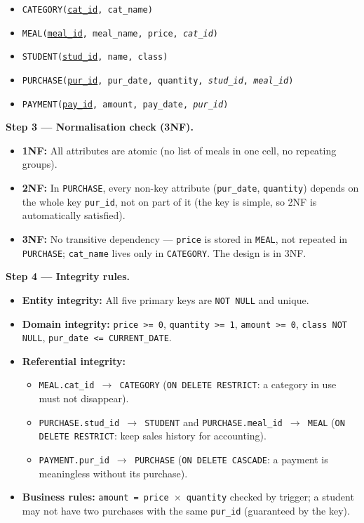 \documentclass[11pt]{article}
\begin{document}
\begin{itemize}
\item \texttt{CATEGORY(\underline{cat\_id}, cat\_name)}
\item \texttt{MEAL(\underline{meal\_id}, meal\_name, price, \emph{cat\_id})}
\item \texttt{STUDENT(\underline{stud\_id}, name, class)}
\item \texttt{PURCHASE(\underline{pur\_id}, pur\_date, quantity, \emph{stud\_id}, \emph{meal\_id})}
\item \texttt{PAYMENT(\underline{pay\_id}, amount, pay\_date, \emph{pur\_id})}
\end{itemize}

\textbf{Step 3 — Normalisation check (3NF).} 
\begin{itemize}
\item \textbf{1NF:} All attributes are atomic (no list of meals in one cell, no repeating groups).
\item \textbf{2NF:} In \texttt{PURCHASE}, every non-key attribute (\texttt{pur\_date}, \texttt{quantity}) depends on the whole key \texttt{pur\_id}, not on part of it (the key is simple, so 2NF is automatically satisfied).
\item \textbf{3NF:} No transitive dependency — \texttt{price} is stored in \texttt{MEAL}, not repeated in \texttt{PURCHASE}; \texttt{cat\_name} lives only in \texttt{CATEGORY}. The design is in 3NF.
\end{itemize}

\textbf{Step 4 — Integrity rules.}
\begin{itemize}
\item \textbf{Entity integrity:} All five primary keys are \texttt{NOT NULL} and unique.
\item \textbf{Domain integrity:} \texttt{price >= 0}, \texttt{quantity >= 1}, \texttt{amount >= 0}, \texttt{class NOT NULL}, \texttt{pur\_date <= CURRENT\_DATE}.
\item \textbf{Referential integrity:}
  \begin{itemize}
  \item \texttt{MEAL.cat\_id $\to$ CATEGORY} (\texttt{ON DELETE RESTRICT}: a category in use must not disappear).
  \item \texttt{PURCHASE.stud\_id $\to$ STUDENT} and \texttt{PURCHASE.meal\_id $\to$ MEAL} (\texttt{ON DELETE RESTRICT}: keep sales history for accounting).
  \item \texttt{PAYMENT.pur\_id $\to$ PURCHASE} (\texttt{ON DELETE CASCADE}: a payment is meaningless without its purchase).
  \end{itemize}
\item \textbf{Business rules:} \texttt{amount = price $\times$ quantity} checked by trigger; a student may not have two purchases with the same \texttt{pur\_id} (guaranteed by the key).
\end{itemize}
\end{document}
